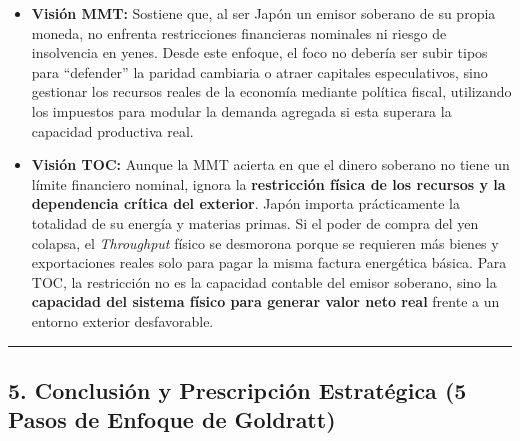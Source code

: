 \documentclass[12pt,letterpaper]{article}
\providecommand{\tightlist}{%
  \setlength{\itemsep}{0pt}\setlength{\parskip}{0pt}}
\begin{document}
\begin{itemize}
\tightlist
\item
  \textbf{Visión MMT:} Sostiene que, al ser Japón un emisor soberano de
  su propia moneda, no enfrenta restricciones financieras nominales ni
  riesgo de insolvencia en yenes. Desde este enfoque, el foco no debería
  ser subir tipos para ``defender'' la paridad cambiaria o atraer
  capitales especulativos, sino gestionar los recursos reales de la
  economía mediante política fiscal, utilizando los impuestos para
  modular la demanda agregada si esta superara la capacidad productiva
  real.
\item
  \textbf{Visión TOC:} Aunque la MMT acierta en que el dinero soberano
  no tiene un límite financiero nominal, ignora la \textbf{restricción
  física de los recursos y la dependencia crítica del exterior}. Japón
  importa prácticamente la totalidad de su energía y materias primas. Si
  el poder de compra del yen colapsa, el \emph{Throughput} físico se
  desmorona porque se requieren más bienes y exportaciones reales solo
  para pagar la misma factura energética básica. Para TOC, la
  restricción no es la capacidad contable del emisor soberano, sino la
  \textbf{capacidad del sistema físico para generar valor neto real}
  frente a un entorno exterior desfavorable.
\end{itemize}

\begin{center}\rule{0.5\linewidth}{0.5pt}\end{center}

\hypertarget{conclusiuxf3n-y-prescripciuxf3n-estratuxe9gica-5-pasos-de-enfoque-de-goldratt}{%
\subsection{5. Conclusión y Prescripción Estratégica (5 Pasos de Enfoque
de
Goldratt)}\label{conclusiuxf3n-y-prescripciuxf3n-estratuxe9gica-5-pasos-de-enfoque-de-goldratt}}
\end{document}
